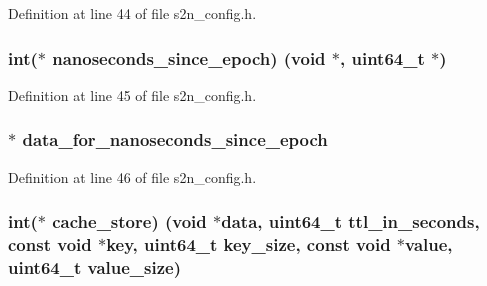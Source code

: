 Definition at line 44 of file s2n\+\_\+config.\+h.

\subsubsection[{\texorpdfstring{nanoseconds\+\_\+since\+\_\+epoch}{nanoseconds_since_epoch}}]{\setlength{\rightskip}{0pt plus 5cm}int($\ast$ nanoseconds\+\_\+since\+\_\+epoch) ({\bf void} $\ast$, uint64\+\_\+t $\ast$)}\hypertarget{structs2n__config_a5c13684f60b915be42223586e6c42e5c}{}\label{structs2n__config_a5c13684f60b915be42223586e6c42e5c}


Definition at line 45 of file s2n\+\_\+config.\+h.

\subsubsection[{\texorpdfstring{data\+\_\+for\+\_\+nanoseconds\+\_\+since\+\_\+epoch}{data_for_nanoseconds_since_epoch}}]{$\ast$ data\+\_\+for\+\_\+nanoseconds\+\_\+since\+\_\+epoch}\hypertarget{structs2n__config_a462e69eaecd0176f077b385c9dd1477b}{}\label{structs2n__config_a462e69eaecd0176f077b385c9dd1477b}


Definition at line 46 of file s2n\+\_\+config.\+h.

\subsubsection[{\texorpdfstring{cache\+\_\+store}{cache_store}}]{\setlength{\rightskip}{0pt plus 5cm}int($\ast$ cache\+\_\+store) ({\bf void} $\ast$data, uint64\+\_\+t ttl\+\_\+in\+\_\+seconds, const {\bf void} $\ast$key, uint64\+\_\+t key\+\_\+size, const {\bf void} $\ast$value, uint64\+\_\+t value\+\_\+size)}\hypertarget{structs2n__config_a346cfdf0a283437f5de8ae4cf2aeec4e}{}\label{structs2n__config_a346cfdf0a283437f5de8ae4cf2aeec4e}


